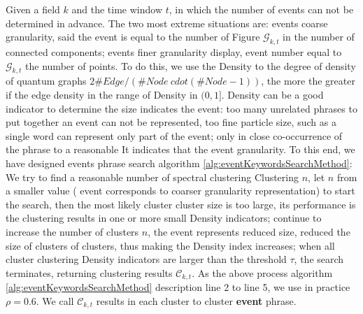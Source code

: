 \documentclass[conference,compsoc]{IEEEtran}
\begin{document}
Given a field \(k\) and the time window \(t\), in which the number of events can not be determined in advance.
The two most extreme situations are: events coarse granularity, said the event is equal to the number of Figure \(\mathcal{G}_{k, t} \) in the number of connected components; events finer granularity display, event number equal to \(\mathcal{G}_{k, t} \) the number of points.
To do this, we use the Density to the degree of density of quantum graphs \(2 \#Edge / (\# Node \ cdot (\# Node-1)) \), the more the greater if the edge density in the range of Density in \((0,1] \).
Density can be a good indicator to determine the size indicates the event: too many unrelated phrases to put together an event can not be represented, too fine particle size, such as a single word can represent only part of the event; only in close co-occurrence of the phrase to a reasonable It indicates that the event granularity.
To this end, we have designed events phrase search algorithm \ref{alg:eventKeywordsSearchMethod}: We try to find a reasonable number of spectral clustering Clustering \(n \), let \(n \) from a smaller value ( event corresponds to coarser granularity representation) to start the search, then the most likely cluster cluster size is too large, its performance is the clustering results in one or more small Density indicators; continue to increase the number of clusters \(n \), the event represents reduced size, reduced the size of clusters of clusters, thus making the Density index increases; when all cluster clustering Density indicators are larger than the threshold \(\tau \), the search terminates, returning clustering results \(\mathcal{C}_{k, t}\).
As the above process algorithm \ref{alg:eventKeywordsSearchMethod} description line 2 to line 5, we use in practice \(\rho = 0.6 \).
We call \(\mathcal{C}_{k, t} \) results in each cluster to cluster \textbf{event} phrase.
\end{document}
